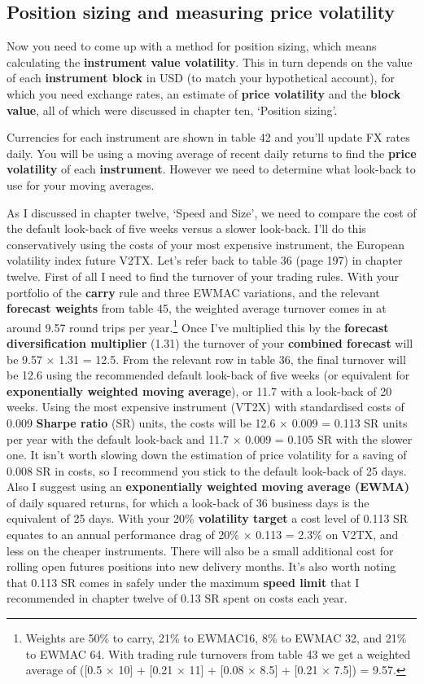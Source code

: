 \subsection*{Position sizing and measuring price volatility}

Now you need to come up with a method for position sizing, which means calculating the \textbf{instrument value volatility}. This in turn depends on the value of each \textbf{instrument block} in USD (to match your hypothetical account), for which you need exchange rates, an estimate of \textbf{price volatility} and the \textbf{block value}, all of which were discussed in chapter ten, ‘Position sizing'.

Currencies for each instrument are shown in table 42 and you'll update FX rates daily. You will be using a moving average of recent daily returns to find the \textbf{price volatility} of each \textbf{instrument}. However we need to determine what look-back to use for your moving averages.

As I discussed in chapter twelve, ‘Speed and Size', we need to compare the cost of the default look-back of five weeks versus a slower look-back. I'll do this conservatively using the costs of your most expensive instrument, the European volatility index future V2TX. Let's refer back to table 36 (page 197) in chapter twelve. First of all I need to find the turnover of your trading rules. With your portfolio of the \textbf{carry} rule and three EWMAC variations, and the relevant \textbf{forecast weights} from table 45, the weighted average turnover comes in at around 9.57 round trips per year.\footnote{Weights are 50\% to carry, 21\% to EWMAC16, 8\% to EWMAC 32, and 21\% to EWMAC 64. With trading rule turnovers from table 43 we get a weighted average of ([0.5 × 10] + [0.21 × 11] + [0.08 × 8.5] + [0.21 × 7.5]) = 9.57.} Once I've multiplied this by the \textbf{forecast diversification multiplier} (1.31) the turnover of your \textbf{combined forecast} will be 9.57 × 1.31 = 12.5. From the relevant row in table 36, the final turnover will be 12.6 using the recommended default look-back of five weeks (or equivalent for \textbf{exponentially weighted moving average}), or 11.7 with a look-back of 20 weeks. Using the most expensive instrument (VT2X) with standardised costs of 0.009 \textbf{Sharpe ratio} (SR) units, the costs will be 12.6 × 0.009 = 0.113 SR units per year with the default look-back and 11.7 × 0.009 = 0.105 SR with the slower one. It isn't worth slowing down the estimation of price volatility for a saving of 0.008 SR in costs, so I recommend you stick to the default look-back of 25 days. Also I suggest using an \textbf{exponentially weighted moving average (EWMA)} of daily squared returns, for which a look-back of 36 business days is the equivalent of 25 days. With your 20\% \textbf{volatility target} a cost level of 0.113 SR equates to an annual performance drag of 20\% × 0.113 = 2.3\% on V2TX, and less on the cheaper instruments. There will also be a small additional cost for rolling open futures positions into new delivery months. It's also worth noting that 0.113 SR comes in safely under the maximum \textbf{speed limit} that I recommended in chapter twelve of 0.13 SR spent on costs each year.


